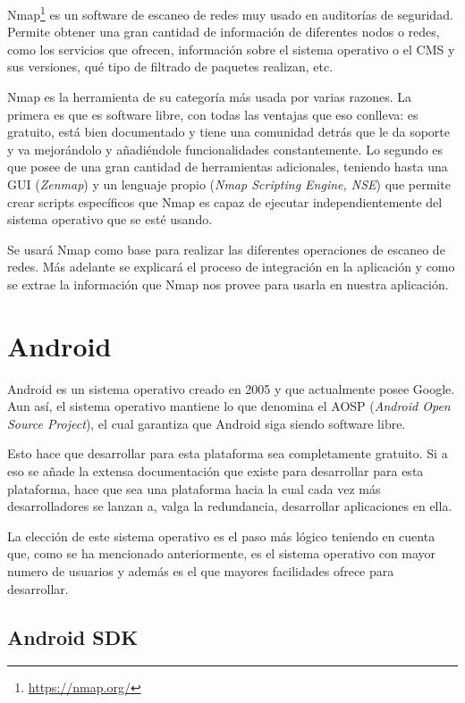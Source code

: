 Nmap\footnote{\url{https://nmap.org/}} es un software de escaneo de redes muy usado en auditorías de seguridad. Permite obtener una gran cantidad de información de diferentes nodos o redes, como los servicios que ofrecen, información sobre el sistema operativo o el CMS y sus versiones, qué tipo de filtrado de paquetes realizan, etc.

Nmap es la herramienta de su categoría más usada por varias razones. La primera es que es software libre, con todas las ventajas que eso conlleva: es gratuito, está bien documentado y tiene una comunidad detrás que le da soporte y va mejorándolo y añadiéndole funcionalidades constantemente. Lo segundo es que posee de una gran cantidad de herramientas adicionales, teniendo hasta una GUI (\textit{Zenmap}) y un lenguaje propio (\textit{Nmap Scripting Engine, NSE}) que permite crear scripts específicos que Nmap es capaz de ejecutar independientemente del sistema operativo que se esté usando.

Se usará Nmap como base para realizar las diferentes operaciones de escaneo de redes. Más adelante se explicará el proceso de integración en la aplicación y como se extrae la información que Nmap nos provee para usarla en nuestra aplicación.


\section{Android}

Android es un sistema operativo creado en 2005 y que actualmente posee Google. Aun así, el sistema operativo mantiene lo que denomina el AOSP (\textit{Android Open Source Project}), el cual garantiza que Android siga siendo software libre.

Esto hace que desarrollar para esta plataforma sea completamente gratuito. Si a eso se añade la extensa documentación que existe para desarrollar para esta plataforma, hace que sea una plataforma hacia la cual cada vez más desarrolladores se lanzan a, valga la redundancia, desarrollar aplicaciones en ella.

La elección de este sistema operativo es el paso más lógico teniendo en cuenta que, como se ha mencionado anteriormente, es el sistema operativo con mayor numero de usuarios y además es el que mayores facilidades ofrece para desarrollar.

\subsection{Android SDK}

